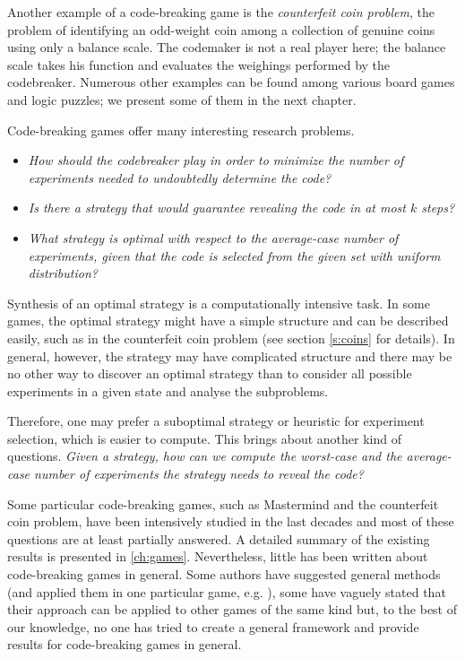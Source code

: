 Another example of a code-breaking game is the \emph{counterfeit coin problem},
  the problem of identifying an odd-weight coin among
  a collection of genuine coins using only a balance scale.
The codemaker is not a real player here; the balance scale takes his function
  and evaluates the weighings performed by the codebreaker.
Numerous other examples can be found among various board games and logic puzzles;
 we present some of them in the next chapter.

Code-breaking games offer many interesting research problems.

\begin{itemize}
\item \emph{How should the codebreaker play in order to minimize the number of experiments
   needed to undoubtedly determine the code?}
\item \emph{Is there a strategy that would guarantee
   revealing the code in at most $k$ steps?}
\item \emph{What strategy is optimal with respect
   to the average-case number of experiments,
   given that the code is selected
   from the given set with uniform distribution?}
\end{itemize}

Synthesis of an optimal strategy is a computationally intensive task.
In some games, the optimal strategy might have a simple
  structure and can be described easily, such as in
  the counterfeit coin problem (see section \autoref{s:coins} for details).
In general, however, the strategy may have complicated structure and
  there may be no other way to discover an optimal strategy
  than to consider all possible experiments
  in a given state and analyse the subproblems.

Therefore, one may prefer a suboptimal strategy or heuristic
  for experiment selection, which is easier to compute.
This brings about another kind of questions.
\emph{Given a strategy,
  how can we compute the worst-case and the average-case number
  of experiments the strategy needs to reveal the code?}

Some particular code-breaking games,
  such as Mastermind and the counterfeit coin problem,
  have been intensively studied in the last decades
  and most of these questions are at least partially answered.
A detailed summary of the existing results is presented in \autoref{ch:games}.
Nevertheless, little has been written about code-breaking games in general.
Some authors have suggested general methods (and applied them in one particular game,
  e.g. \cite{cbg-stgopt, cbg-gen}),
  some have vaguely stated that their approach can be applied
  to other games of the same kind but,
  to the best of our knowledge, no one has tried to
  create a general framework and provide
   results for code-breaking games in general.


